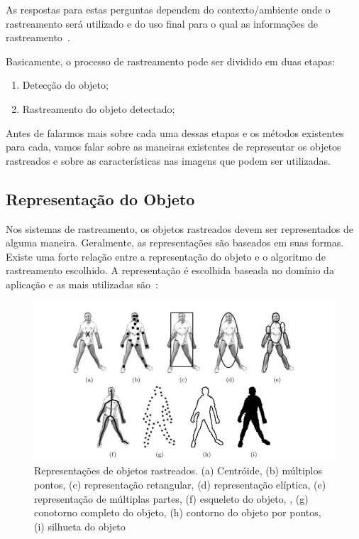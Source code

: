 	As respostas para estas perguntas dependem do contexto/ambiente onde o rastreamento será utilizado e do uso final para o qual as informações de rastreamento~\cite{yilmaz}.

	Basicamente, o processo de rastreamento pode ser dividido em duas etapas:

		\begin{enumerate}
			\item Detecção do objeto;
			\item Rastreamento do objeto detectado;
		\end{enumerate}

	Antes de falarmos mais sobre cada uma dessas etapas e os métodos existentes para cada, vamos falar sobre as maneiras existentes de representar os objetos rastreados e sobre as características nas imagens que podem ser utilizadas.


\subsection{Representação do Objeto}

	Nos sistemas de rastreamento, os objetos rastreados devem ser representados de alguma maneira. Geralmente, as representações são baseados em suas formas. Existe uma forte relação entre a representação do objeto e o algoritmo de rastreamento escolhido. A representação é escolhida baseada no domínio da aplicação e as mais utilizadas são~\cite{yilmaz}:

	\begin{figure}[hbt]
		\begin{center}
			\includegraphics[scale=0.5]{figuras/2.FundamentacaoTeorica/representacao.png}
		\end{center}
		\caption{Representações de objetos rastreados. (a) Centróide, (b) múltiplos pontos, (c) representação retangular, (d) representação elíptica, (e) representação de múltiplas partes, (f) esqueleto do objeto, , (g) conotorno completo do objeto, (h) contorno do objeto por pontos, (i) silhueta do objeto~\cite{yilmaz}}
		\label{representacao}
	\end{figure}

